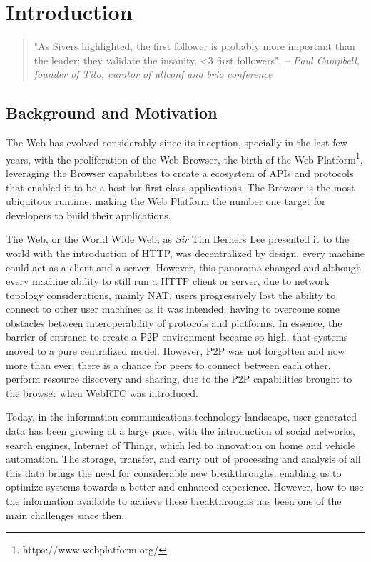 \chapter{Introduction}\label{ch:intro}

\begin{quotation}
    "As Sivers highlighted, the first follower is probably more important than the leader: they validate the insanity. \textless3 first followers".
    {\small\it -- Paul Campbell, founder of Tito, curator of ullconf and brio conference}
\end{quotation}

\section{Background and Motivation}

The Web has evolved considerably since its inception, specially in the last few years, with the proliferation of the Web Browser, the birth of the Web Platform\footnote{https://www.webplatform.org/}, leveraging the Browser capabilities to create a ecosystem of APIs and protocols that enabled it to be a host for first class applications. The Browser is the most ubiquitous runtime, making the Web Platform the number one target for developers to build their applications.

The Web, or the World Wide Web, as \textit{Sir} Tim Berners Lee presented it to the world with the introduction of HTTP, was decentralized by design, every machine could act as a client and a server. However, this panorama changed and although every machine ability to still run a HTTP client or server, due to network topology considerations, mainly NAT, users progressively lost the ability to connect to other user machines as it was intended, having to overcome some obstacles between interoperability of protocols and platforms. In essence, the barrier of entrance to create a P2P environment became so high, that systems moved to a pure centralized model. However, P2P was not forgotten and now more than ever, there is a chance for peers to connect between each other, perform resource discovery and sharing, due to the P2P capabilities brought to the browser when WebRTC was introduced.

Today, in the information communications technology landscape, user generated data has been growing at a large pace, with the introduction of social networks, search engines, Internet of Things, which led to innovation on home and vehicle automation. The storage, transfer, and carry out of processing and analysis of all this data brings the need for considerable new breakthroughs, enabling us to optimize systems towards a better and enhanced experience. However, how to use the information available to achieve these breakthroughs has been one of the main challenges since then.

